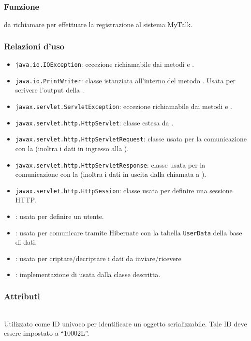 
\subsubsection*{Funzione}
 da richiamare per effettuare la registrazione al sistema MyTalk.

\subsubsection*{Relazioni d'uso}
\begin{itemize}
	\item \texttt{java.io.IOException}: eccezione richiamabile dai metodi  e .
	\item \texttt{java.io.PrintWriter}: classe istanziata all'interno del metodo . Usata per scrivere l'output della .
	\item \texttt{javax.servlet.ServletException}: eccezione richiamabile dai metodi  e .
	\item \texttt{javax.servlet.http.HttpServlet}: classe estesa da .
	\item \texttt{javax.servlet.http.HttpServletRequest}:  classe usata per la comunicazione con la  (inoltra i dati in ingresso alla ).
	\item \texttt{javax.servlet.http.HttpServletResponse}: classe usata per la comunicazione con la  (inoltra i dati in uscita dalla chiamata a ).
	\item \texttt{javax.servlet.http.HttpSession}: classe usata per definire una sessione HTTP.
	\item {}: usata per definire un utente.
	\item {}: usata per comunicare tramite Hibernate con la tabella \texttt{UserData} della base di dati.
	\item {}: usata per criptare/decriptare i dati da inviare/ricevere
	\item {}: implementazione di  usata dalla classe descritta.
	
\end{itemize}

\subsubsection*{Attributi}
\begin{description}
  \item{}\\
  Utilizzato come ID univoco per identificare un oggetto serializzabile. Tale ID deve essere impostato a ``10002L''.
\end{description}

